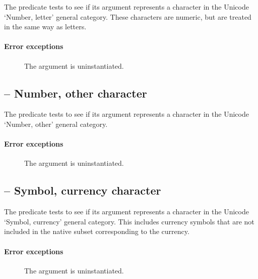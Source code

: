The  predicate tests to see if its  argument represents a character in the Unicode `Number, letter' general category. These characters are numeric, but are treated in the same way as letters.
        
\paragraph{Error exceptions}
\begin{description}
\item[]
The argument is uninstantiated.
\end{description}

\subsection{ -- Number, other character}
\label{chars:isNoChar}

The  predicate tests to see if its  argument represents a character in the Unicode `Number, other' general category. 
        
\paragraph{Error exceptions}
\begin{description}
\item[]
The argument is uninstantiated.
\end{description}

\subsection{ -- Symbol, currency character}
\label{chars:isScChar}

The  predicate tests to see if its  argument represents a character in the Unicode `Symbol, currency' general category. This includes currency symbols that are not included in the native subset corresponding to the currency.
        
\paragraph{Error exceptions}
\begin{description}
\item[]
The argument is uninstantiated.
\end{description}

